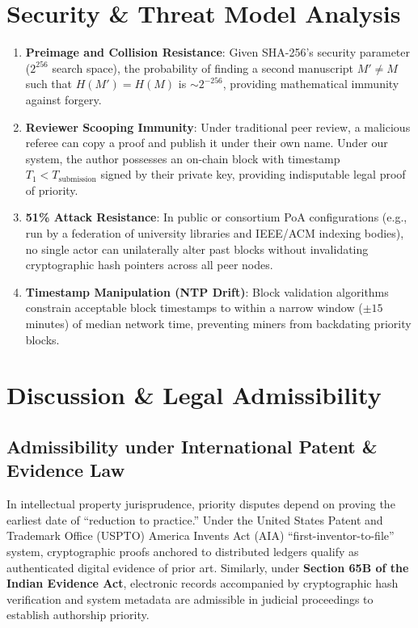 \documentclass[conference]{IEEEtran}
\begin{document}
\section{Security \& Threat Model Analysis}
\begin{enumerate}
    \item \textbf{Preimage and Collision Resistance}: Given SHA-256's security parameter ($2^{256}$ search space), the probability of finding a second manuscript $M' \neq M$ such that $H(M') = H(M)$ is $\sim 2^{-256}$, providing mathematical immunity against forgery.
    \item \textbf{Reviewer Scooping Immunity}: Under traditional peer review, a malicious referee can copy a proof and publish it under their own name. Under our system, the author possesses an on-chain block with timestamp $T_1 < T_{\text{submission}}$ signed by their private key, providing indisputable legal proof of priority.
    \item \textbf{51\% Attack Resistance}: In public or consortium PoA configurations (e.g., run by a federation of university libraries and IEEE/ACM indexing bodies), no single actor can unilaterally alter past blocks without invalidating cryptographic hash pointers across all peer nodes.
    \item \textbf{Timestamp Manipulation (NTP Drift)}: Block validation algorithms constrain acceptable block timestamps to within a narrow window ($\pm 15$ minutes) of median network time, preventing miners from backdating priority blocks.
\end{enumerate}

\section{Discussion \& Legal Admissibility}

\subsection{Admissibility under International Patent \& Evidence Law}
In intellectual property jurisprudence, priority disputes depend on proving the earliest date of ``reduction to practice.'' Under the United States Patent and Trademark Office (USPTO) America Invents Act (AIA) ``first-inventor-to-file'' system, cryptographic proofs anchored to distributed ledgers qualify as authenticated digital evidence of prior art. Similarly, under \textbf{Section 65B of the Indian Evidence Act}, electronic records accompanied by cryptographic hash verification and system metadata are admissible in judicial proceedings to establish authorship priority.
\end{document}
